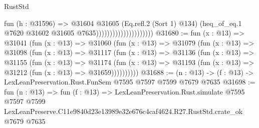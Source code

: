 \begin{lexlean}{RustStd}
\begin{coremodule}
                                          fun (h : @31596) =>
                                          @31604
                                            @31605
                                            (Eq.refl.{2} (Sort 1) @134)
                                            (heq_of_eq.{1}
                                              @7620
                                              @31602
                                              @31605
                                              @7635)))))))))))))))))))))
@31680 := fun (x : @13) =>
  @31041
    (fun (x : @13) =>
    @31060
      (fun (x : @13) =>
      @31079
        (fun (x : @13) =>
        @31098
          (fun (x : @13) =>
          @31117
            (fun (x : @13) =>
            @31136
              (fun (x : @13) =>
              @31155
                (fun (x : @13) =>
                @31174
                  (fun (x : @13) =>
                  @31193 (fun (x : @13) => @31212 (fun (x : @13) => @31659))))))))))
@31688 := (n : @13) -> (f : @13) -> LexLeanPreservation.Rust.FunSem @7595 @7597 @7599 @7679 @7635
@31698 := fun (n : @13) =>
  fun (f : @13) =>
  LexLeanPreservation.Rust.simulate
    @7595
    @7597
    @7599
    LexLeanPreserve.C11e9840d23e13989e32e676c4caf4624.R27.RustStd.crate_ok
    @7679
    @7635
\end{coremodule}
\end{lexlean}
